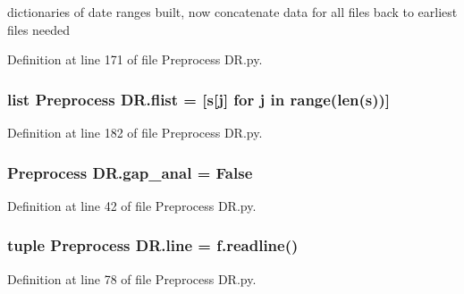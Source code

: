 dictionaries of date ranges built, now concatenate data for all files back to earliest files needed 



Definition at line 171 of file Preprocess D\+R.\+py.

\hypertarget{namespace_preprocess_01_d_r_afda23e41cb65dc5791e2e602863d22a6}{}
\subsubsection[{flist}]{\setlength{\rightskip}{0pt plus 5cm}list Preprocess D\+R.\+flist = \mbox{[}{\bf s}\mbox{[}j\mbox{]} for j in range(len({\bf s}))\mbox{]}}\label{namespace_preprocess_01_d_r_afda23e41cb65dc5791e2e602863d22a6}


Definition at line 182 of file Preprocess D\+R.\+py.

\hypertarget{namespace_preprocess_01_d_r_ad7dfeae6dec3bc6a6c9446124ceafdc3}{}
\subsubsection[{gap\+\_\+anal}]{\setlength{\rightskip}{0pt plus 5cm}Preprocess D\+R.\+gap\+\_\+anal = False}\label{namespace_preprocess_01_d_r_ad7dfeae6dec3bc6a6c9446124ceafdc3}


Definition at line 42 of file Preprocess D\+R.\+py.

\hypertarget{namespace_preprocess_01_d_r_adf993ed19a62ed0125e7086027d99260}{}
\subsubsection[{line}]{\setlength{\rightskip}{0pt plus 5cm}tuple Preprocess D\+R.\+line = f.\+readline()}\label{namespace_preprocess_01_d_r_adf993ed19a62ed0125e7086027d99260}


Definition at line 78 of file Preprocess D\+R.\+py.

\hypertarget{namespace_preprocess_01_d_r_aae343c994d5743a749e85f21f6ed62a2}{}
